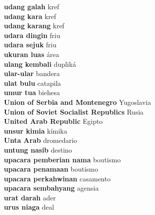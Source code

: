 \textbf{ udang galah  } kref \\
\textbf{ udang kara  } kref \\
\textbf{ udang karang  } kref \\
\textbf{ udara dingin  } friu \\
\textbf{ udara sejuk  } friu \\
\textbf{ ukuran luas  } área \\
\textbf{ ulang kembali  } dupliká \\
\textbf{ ular-ular  } bandera \\
\textbf{ ulat bulu  } catapila \\
\textbf{ umur tua  } biehesa \\
\textbf{ Union of Serbia and Montenegro  } Yugoslavia \\
\textbf{ Union of Soviet Socialist Republics  } Rusia \\
\textbf{ United Arab Republic  } Egipto \\
\textbf{ unsur kimia  } kímika \\
\textbf{ Unta Arab  } dromedario \\
\textbf{ untung nasib  } destino \\
\textbf{ upacara pemberian nama  } boutismo \\
\textbf{ upacara penamaan  } boutismo \\
\textbf{ upacara perkahwinan  } casamento \\
\textbf{ upacara sembahyang  } agensia \\
\textbf{ urat darah  } ader \\
\textbf{ urus niaga  } deal \\

